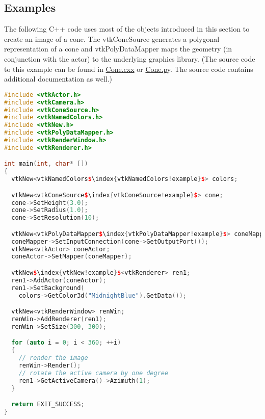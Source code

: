 \subsection{Examples}

\begin{description}[leftmargin=0cm,labelindent=0cm]

\item[Render a Cone.] The following C++ code uses most of the objects introduced in this section to create an image of a cone. The vtkConeSource generates a polygonal representation of a cone and vtkPolyDataMapper maps the geometry (in conjunction with the actor) to the underlying graphics library. (The source code to this example can be found in \href{https://lorensen.github.io/VTKExamples/site/Cxx/GeometricObjects/Cone/}{Cone.cxx} or \href{https://lorensen.github.io/VTKExamples/site/Python/GeometricObjects/Cone/}{Cone.py}. The source code contains additional documentation as well.)

\label{eg:render_cone}
\begin{lstlisting}[language=C++, caption={Cone.cxx}, escapechar=\$]
#include <vtkActor.h>
#include <vtkCamera.h>
#include <vtkConeSource.h>
#include <vtkNamedColors.h>
#include <vtkNew.h>
#include <vtkPolyDataMapper.h>
#include <vtkRenderWindow.h>
#include <vtkRenderer.h>

int main(int, char* [])
{
  vtkNew<vtkNamedColors$\index{vtkNamedColors!example}$> colors;

  vtkNew<vtkConeSource$\index{vtkConeSource!example}$> cone;
  cone->SetHeight(3.0);
  cone->SetRadius(1.0);
  cone->SetResolution(10);

  vtkNew<vtkPolyDataMapper$\index{vtkPolyDataMapper!example}$> coneMapper;
  coneMapper->SetInputConnection(cone->GetOutputPort());
  vtkNew<vtkActor> coneActor;
  coneActor->SetMapper(coneMapper);

  vtkNew$\index{vtkNew!example}$<vtkRenderer> ren1;
  ren1->AddActor(coneActor);
  ren1->SetBackground(
    colors->GetColor3d("MidnightBlue").GetData());

  vtkNew<vtkRenderWindow> renWin;
  renWin->AddRenderer(ren1);
  renWin->SetSize(300, 300);

  for (auto i = 0; i < 360; ++i)
  {
    // render the image
    renWin->Render();
    // rotate the active camera by one degree
    ren1->GetActiveCamera()->Azimuth(1);
  }

  return EXIT_SUCCESS;
}
\end{lstlisting}


\end{description}
